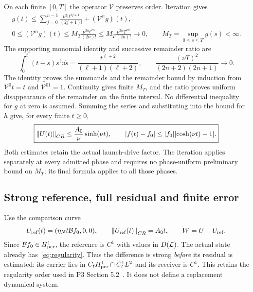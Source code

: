 On each finite $[0,T]$ the operator $\mathcal V$ preserves order. Iteration gives
\begin{equation}\label{eq:iteration}%
\begin{gathered}
g(t)\le\sum_{j=0}^{n-1}\frac{\nu^{2j}t^{2j+1}}{(2j+1)!}
+(\mathcal V^ng)(t),\\
0\le(\mathcal V^ng)(t)\le
M_T\frac{\nu^{2n}t^{2n}}{(2n)!}
\le M_T\frac{\nu^{2n}T^{2n}}{(2n)!}\longrightarrow0,\qquad
M_T=\sup_{0\le s\le T}g(s)<\infty.
\end{gathered}
\end{equation}
The supporting monomial identity and successive remainder ratio are
\begin{equation}\label{eq:remainder}%
\int_0^t(t-s)s^\ell\dd s
=\frac{t^{\ell+2}}{(\ell+1)(\ell+2)},\qquad
\frac{(\nu T)^2}{(2n+2)(2n+1)}\longrightarrow0.
\end{equation}
The identity proves the summands and the remainder bound by induction from $\mathcal V^0t=t$ and $\mathcal V^01=1$. Continuity gives finite $M_T$, and the ratio proves uniform disappearance of the remainder on the finite interval. No differential inequality for $g$ at zero is assumed. Summing the series and substituting into the bound for $h$ give, for every finite $t\ge0$,
\begin{equation}\label{eq:hyperbolic}%
\boxed{\norm{U(t)}_{CR}\le\frac{A_0}{\nu}\sinh(\nu t),\qquad
|f(t)-f_0|\le |f_0|[\cosh(\nu t)-1].}
\end{equation}
Both estimates retain the actual launch-drive factor. The iteration applies separately at every admitted phase and requires no phase-uniform preliminary bound on $M_T$; its final formula applies to all those phases.

\subsection{Strong reference, full residual and finite error}
Use the comparison curve
\begin{equation}\label{eq:reference}%
U_{\rm ref}(t)=(\eta_Nt\B f_0,0,0),\qquad
\norm{U_{\rm ref}(t)}_{CR}=A_0t,\qquad W=U-U_{\rm ref}.
\end{equation}
Since $\mathcal B f_0\in H^1_{\rm per}$, the reference is $C^1$ with values in $D(\mathcal L)$. The actual state already has~\eqref{eq:regularity}. Thus the difference is strong \emph{before} its residual is estimated: its carrier lies in $C_tH^1_{\rm per}\cap C_t^1L^2$ and its receiver is $C^1$. This retains the regularity order used in P3 Section 5.2~\cite{p3}. It does not define a replacement dynamical system.

